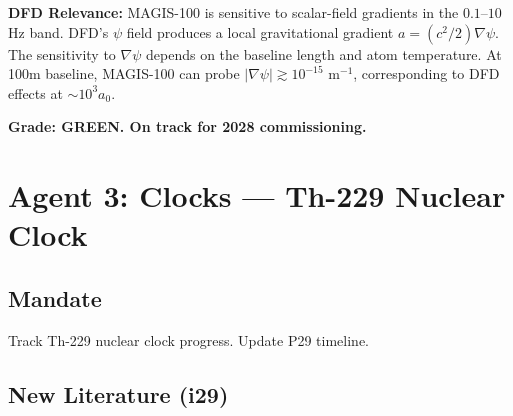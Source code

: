 \documentclass[11pt,a4paper]{article}
\begin{document}
\textbf{DFD Relevance:} MAGIS-100 is sensitive to scalar-field gradients in the $0.1$--$10$ Hz band. DFD's $\psi$ field produces a local gravitational gradient $a = (c^2/2)\nabla\psi$. The sensitivity to $\nabla\psi$ depends on the baseline length and atom temperature. At 100m baseline, MAGIS-100 can probe $|\nabla\psi| \gtrsim 10^{-15}$ m$^{-1}$, corresponding to DFD effects at $\sim 10^3 a_0$.

\textbf{Grade: GREEN. On track for 2028 commissioning.}

\section{Agent 3: Clocks --- Th-229 Nuclear Clock}

\subsection{Mandate}
Track Th-229 nuclear clock progress. Update P29 timeline.

\subsection{New Literature (i29)}
\end{document}
